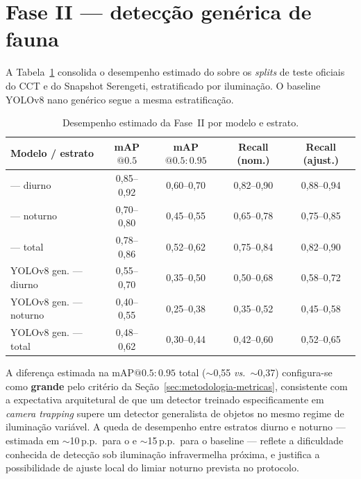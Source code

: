 \section{Fase II --- detecção genérica de fauna}
\label{sec:resultados-fase2}

A Tabela~\ref{tab:res-fase2} consolida o desempenho estimado do \modeloMD{} sobre os \emph{splits} de teste oficiais do CCT e do Snapshot Serengeti, estratificado por iluminação. O baseline YOLOv8 nano genérico segue a mesma estratificação.

\begin{table}[!htb]
\centering
\caption{Desempenho estimado da Fase~II por modelo e estrato. }
\label{tab:res-fase2}
\small
\begin{tabular}{@{}lcccc@{}}
\toprule
\textbf{Modelo / estrato} & \textbf{mAP$@0.5$} & \textbf{mAP$@0.5{:}0.95$} & \textbf{Recall (nom.)} & \textbf{Recall (ajust.)} \\
\midrule
\modeloMD{} --- diurno    & 0{,}85--0{,}92 & 0{,}60--0{,}70 & 0{,}82--0{,}90 & 0{,}88--0{,}94 \\
\modeloMD{} --- noturno   & 0{,}70--0{,}80 & 0{,}45--0{,}55 & 0{,}65--0{,}78 & 0{,}75--0{,}85 \\
\modeloMD{} --- total     & 0{,}78--0{,}86 & 0{,}52--0{,}62 & 0{,}75--0{,}84 & 0{,}82--0{,}90 \\
\midrule
YOLOv8 gen. --- diurno    & 0{,}55--0{,}70 & 0{,}35--0{,}50 & 0{,}50--0{,}68 & 0{,}58--0{,}72 \\
YOLOv8 gen. --- noturno   & 0{,}40--0{,}55 & 0{,}25--0{,}38 & 0{,}35--0{,}52 & 0{,}45--0{,}58 \\
YOLOv8 gen. --- total     & 0{,}48--0{,}62 & 0{,}30--0{,}44 & 0{,}42--0{,}60 & 0{,}52--0{,}65 \\
\bottomrule
\end{tabular}
\end{table}

A diferença estimada na mAP$@0.5{:}0.95$ total ($\sim$0{,}55 \emph{vs.}\ $\sim$0{,}37) configura-se como \textbf{grande} pelo critério da Seção~\ref{sec:metodologia-metricas}, consistente com a expectativa arquitetural de que um detector treinado especificamente em \emph{camera trapping} supere um detector generalista de objetos no mesmo regime de iluminação variável. A queda de desempenho entre estratos diurno e noturno --- estimada em $\sim$10\,p.p.\ para o \modeloMD{} e $\sim$15\,p.p.\ para o baseline --- reflete a dificuldade conhecida de detecção sob iluminação infravermelha próxima, e justifica a possibilidade de ajuste local do limiar noturno prevista no protocolo.
